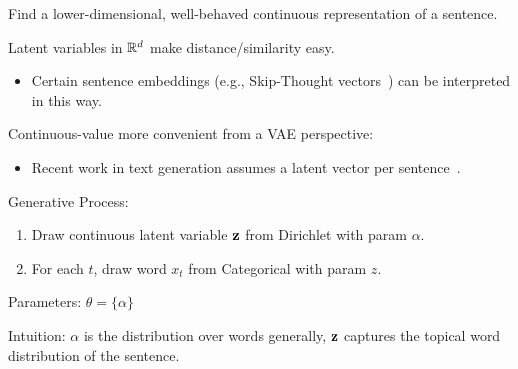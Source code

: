 \begin{frame}

\begin{center}
\end{center}

Find a lower-dimensional, well-behaved  continuous representation of a sentence.
\air 

Latent variables in $\mathbb{R}^d$ make distance/similarity easy. 

\begin{itemize}
    \item Certain sentence embeddings (e.g., Skip-Thought vectors~\citep{kiros2015skip}) can be interpreted in this way.
\end{itemize}

\pause
Continuous-value more convenient from a VAE perspective:
\begin{itemize}
    \item Recent work in text generation assumes a latent vector per sentence~\citep{Bowman2016,Yang2017,hu2017toward}.
\end{itemize}
\end{frame}

\begin{frame}
\vspace{0.25cm}

Generative Process:
\begin{enumerate}
    \item Draw continuous latent variable $\mathbf{z}$ from Dirichlet with param $\alpha$.
    \item For each $t$, draw word $x_t$ from Categorical with param $z$.
\end{enumerate}
\air

Parameters: $\theta= \{\alpha\}$

\air

Intuition: $\alpha$ is the distribution over words generally, $\mathbf{z}$ captures the topical word distribution of the sentence. 
\end{frame}

